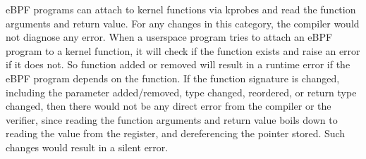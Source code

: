 eBPF programs can attach to kernel functions via kprobes and read the function arguments and return value.
For any changes in this category, the compiler would not diagnose any error.
When a userspace program tries to attach an eBPF program to a kernel function,
it will check if the function exists and raise an error if it does not.
So function added or removed will result in a runtime error if the eBPF program depends on the function.
If the function signature is changed, including the parameter added/removed, type changed, reordered, or return type changed,
then there would not be any direct error from the compiler or the verifier, since reading the function arguments and return value
boils down to reading the value from the register, and dereferencing the pointer stored.
Such changes would result in a silent error.



